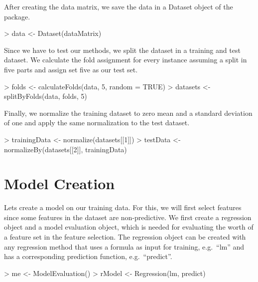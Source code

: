 \documentclass{article}
\begin{document}
After creating the data matrix, we save the data in a Dataset object
of the package.

\begin{Schunk}
\begin{Sinput}
> data <- Dataset(dataMatrix)
\end{Sinput}
\end{Schunk}

Since we have to test our methods, we split the dataset in
a training and test dataset. We calculate the fold assignment for
every instance assuming a split in five parts and assign set five
as our test set.

\begin{Schunk}
\begin{Sinput}
> folds <- calculateFolds(data, 5, random = TRUE)
> datasets <- splitByFolds(data, folds, 5)
\end{Sinput}
\end{Schunk}

Finally, we normalize the training dataset to zero mean and a
standard deviation of one and apply the same normalization to
the test dataset.

\begin{Schunk}
\begin{Sinput}
> trainingData <- normalize(datasets[[1]])
> testData <- normalizeBy(datasets[[2]], trainingData)
\end{Sinput}
\end{Schunk}


\section{Model Creation}

Lets create a model on our training data. For this, we
will first select features since some features in the dataset
are non-predictive. We first create a regression object and
a model evaluation object, which is needed for evaluating
the worth of a feature set in the feature selection.
The regression object can be created with any regression
method that uses a formula as input for training, e.g.\ ``lm''
and has a corresponding prediction function, e.g.\ ``predict''.

\begin{Schunk}
\begin{Sinput}
> me <- ModelEvaluation()
> rModel <- Regression(lm, predict)
\end{Sinput}
\end{Schunk}
\end{document}
